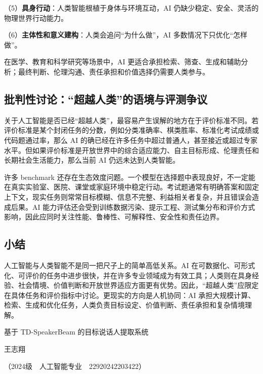 \documentclass[UTF8,zihao=5,a4paper]{ctexart}
\begin{document}
（5）\textbf{具身行动}：人类智能根植于身体与环境互动，AI 仍缺少稳定、安全、灵活的物理世界行动能力。

（6）\textbf{主体性和意义建构}：人类会追问“为什么做”，AI 多数情况下只优化“怎样做”。

在医学、教育和科学研究等场景中，AI 更适合承担检索、筛查、生成和辅助分析；最终判断、伦理沟通、责任承担和价值选择仍需要人类参与。

\subsection{批判性讨论：“超越人类”的语境与评测争议}

关于人工智能是否已经“超越人类”，最容易产生误解的地方在于评价标准不同。若评价标准是某个封闭任务的分数，例如分类准确率、棋类胜率、标准化考试成绩或代码题通过率，那么 AI 的确已经在许多任务中超过普通人，甚至接近或超过专家水平。但如果评价标准是开放世界中的综合适应能力、自主目标形成、伦理责任和长期社会生活能力，那么当前 AI 仍远未达到人类智能。

许多 benchmark 还存在生态效度问题。一个模型在选择题中表现良好，不一定能在真实实验室、医院、课堂或家庭环境中稳定行动。考试题通常有明确答案和固定上下文，现实任务则常常目标模糊、信息不完整、利益相关者复杂，并且错误会造成后果。AI 能力评估还会受到训练数据污染、提示工程、测试集分布和评价方式影响，因此应同时关注性能、鲁棒性、可解释性、安全性和责任边界。

\subsection{小结}

人工智能与人类智能不是同一把尺子上的简单高低关系。AI 在可数据化、可形式化、可评价的任务中进步很快，并在许多专业领域成为有效工具；人类则在具身经验、社会情境、价值判断和开放世界适应方面更有优势。因此，“超越人类”应限定在具体任务和评价指标中讨论。更现实的方向是人机协同：AI 承担大规模计算、检索、生成和优化任务，人类负责目标设定、价值判断、责任承担和复杂情境理解。

\newpage

{\centering{}\heiti 基于 TD-SpeakerBeam 的目标说话人提取系统\par}
\vspace{2\baselineskip}
{\centering{}\songti 王志翔\par}
{\centering{}\songti （2024级~~人工智能专业~~22920242203422）\par}
\vspace{\baselineskip}
\end{document}
